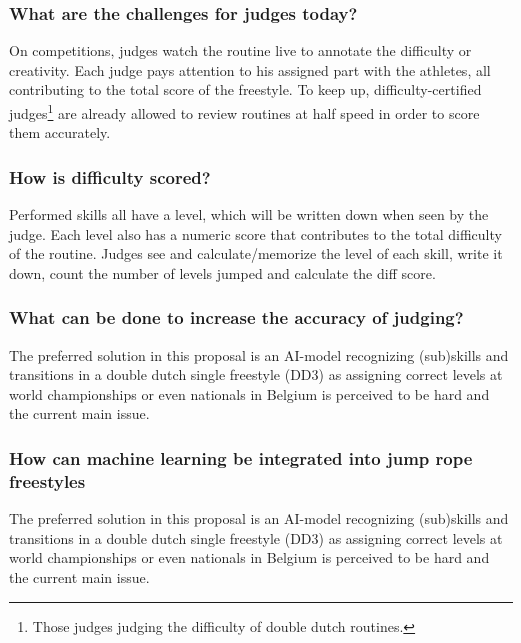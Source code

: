 \subsubsection{What are the challenges for judges today?}
\label{subsubsec:intro-question-challenges-for-judges}

On competitions, judges watch the routine live to annotate the difficulty or creativity. Each judge pays attention to his assigned part with the athletes, all contributing to the total score of the freestyle. To keep up, difficulty-certified judges\footnote{Those judges judging the difficulty of double dutch routines.} are already allowed to review routines at half speed in order to score them accurately.

\subsubsection{How is difficulty scored?}
\label{subsubsec:intro-question-difficulty-scored}

Performed skills all have a level, which will be written down when seen by the judge. Each level also has a numeric score that contributes to the total difficulty of the routine. Judges see and calculate/memorize the level of each skill, write it down, count the number of levels jumped and calculate the diff score.

\subsubsection{What can be done to increase the accuracy of judging?}
\label{subsubsec:intro-question-how-to-increase-accuracy}

The preferred solution in this proposal is an AI-model recognizing (sub)skills and transitions in a double dutch single freestyle (DD3) as assigning correct levels at world championships or even nationals in Belgium is perceived to be hard and the current main issue.

\subsubsection{How can machine learning be integrated into jump rope freestyles}
\label{subsubsec:intro-question-integration}

The preferred solution in this proposal is an AI-model recognizing (sub)skills and transitions in a double dutch single freestyle (DD3) as assigning correct levels at world championships or even nationals in Belgium is perceived to be hard and the current main issue.

